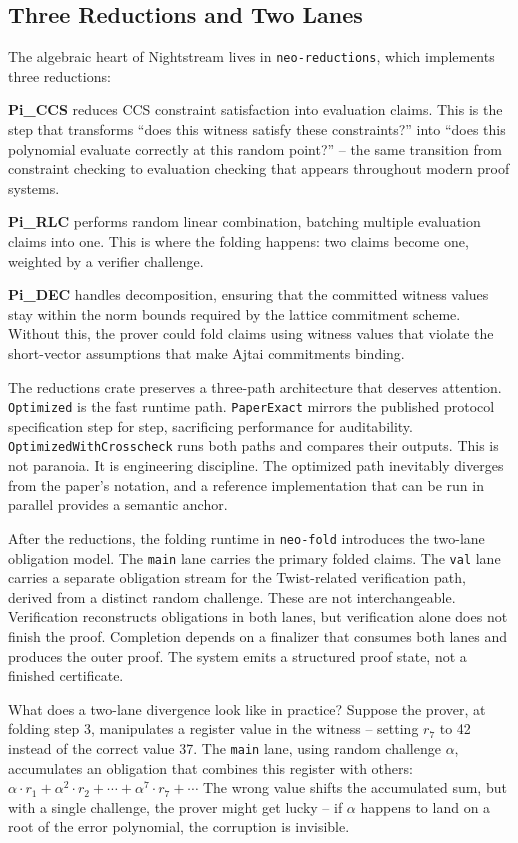 \documentclass[
  11pt,
  openany]{report}
\renewcommand{\textbf}[1]{{\bfseries\color{MidnightBold}#1}}
\begin{document}
\subsection{Three Reductions and Two
Lanes}\label{three-reductions-and-two-lanes}

The algebraic heart of Nightstream lives in \texttt{neo-reductions}, which
implements three reductions:

\textbf{Pi\_CCS} reduces CCS constraint satisfaction into evaluation claims.
This is the step that transforms ``does this witness satisfy these
constraints?'' into ``does this polynomial evaluate correctly at this random
point?'' -- the same transition from constraint checking to evaluation checking
that appears throughout modern proof systems.

\textbf{Pi\_RLC} performs random linear combination, batching multiple
evaluation claims into one. This is where the folding happens: two claims become
one, weighted by a verifier challenge.

\textbf{Pi\_DEC} handles decomposition, ensuring that the committed witness
values stay within the norm bounds required by the lattice commitment scheme.
Without this, the prover could fold claims using witness values that violate the
short-vector assumptions that make Ajtai commitments binding.

The reductions crate preserves a three-path architecture that deserves
attention. \texttt{Optimized} is the fast runtime path. \texttt{PaperExact}
mirrors the published protocol specification step for step, sacrificing
performance for auditability. \texttt{OptimizedWithCrosscheck} runs both paths
and compares their outputs. This is not paranoia. It is engineering discipline.
The optimized path inevitably diverges from the paper's notation, and a
reference implementation that can be run in parallel provides a semantic anchor.

After the reductions, the folding runtime in \texttt{neo-fold} introduces the
two-lane obligation model. The \texttt{main} lane carries the primary folded
claims. The \texttt{val} lane carries a separate obligation stream for the
Twist-related verification path, derived from a distinct random challenge. These
are not interchangeable. Verification reconstructs obligations in both lanes,
but verification alone does not finish the proof. Completion depends on a
finalizer that consumes both lanes and produces the outer proof. The system
emits a structured proof state, not a finished certificate.

What does a two-lane divergence look like in practice? Suppose the prover, at
folding step 3, manipulates a register value in the witness -- setting \(r_7\)
to 42 instead of the correct value 37. The \texttt{main} lane, using random
challenge \(\alpha\), accumulates an obligation that combines this register with
others:
\(\alpha \cdot r_1 + \alpha^2 \cdot r_2 + \cdots + \alpha^7 \cdot r_7 + \cdots\)
The wrong value shifts the accumulated sum, but with a single challenge, the
prover might get lucky -- if \(\alpha\) happens to land on a root of the error
polynomial, the corruption is invisible.
\end{document}
